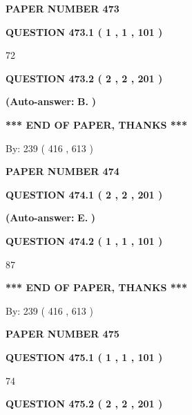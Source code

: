 \documentclass[12pt]{article}
\begin{document}
   
\newpage 
\setcounter{page}{ 
   473001 } 
   
   
 {\textbf{ \Large{ PAPER NUMBER  473  }}}
   
   
   
   
  
  
{\textbf{\large{QUESTION
473.1 
 ( 1 , 1 , 101 )
}}}

72
  
  
{\textbf{\large{QUESTION
473.2 
 ( 2 , 2 , 201 )
}}}
 
 
{\textbf{(Auto-answer:}}
{\textbf{\large{
B.}}}
{\textbf{)}}
 
 
   
   
   
   
\vspace{1.0in} 
{\textbf{\large{ *** END OF PAPER, THANKS *** }}} 
   
   
\hspace{1.0in} By: 
 239 ( 416 ,  613 )
   
   
   
   
\newpage 
\setcounter{page}{ 
   474001 } 
   
   
 {\textbf{ \Large{ PAPER NUMBER  474  }}}
   
   
   
   
  
  
{\textbf{\large{QUESTION
474.1 
 ( 2 , 2 , 201 )
}}}
 
 
{\textbf{(Auto-answer:}}
{\textbf{\large{
E.}}}
{\textbf{)}}
 
 
  
  
{\textbf{\large{QUESTION
474.2 
 ( 1 , 1 , 101 )
}}}

87
   
   
   
   
\vspace{1.0in} 
{\textbf{\large{ *** END OF PAPER, THANKS *** }}} 
   
   
\hspace{1.0in} By: 
 239 ( 416 ,  613 )
   
   
   
   
\newpage 
\setcounter{page}{ 
   475001 } 
   
   
 {\textbf{ \Large{ PAPER NUMBER  475  }}}
   
   
   
   
  
  
{\textbf{\large{QUESTION
475.1 
 ( 1 , 1 , 101 )
}}}

74
  
  
{\textbf{\large{QUESTION
475.2 
 ( 2 , 2 , 201 )
}}}
 
\end{document}
